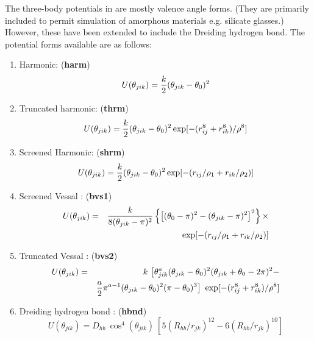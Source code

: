 The three-body potentials in \D are
mostly valence angle forms.  (They
are primarily included to permit simulation of amorphous materials
e.g. silicate glasses.)  However, these have been extended to
include the Dreiding \cite{mayo-90a}
hydrogen bond.  The potential forms available are as follows:
\begin{enumerate}
\item Harmonic:  ({\bf harm})
\begin{equation}
U(\theta_{jik}) = {k \over 2} (\theta_{jik} - \theta_{0})^{2}
\end{equation}
\item Truncated harmonic:  ({\bf thrm})
\begin{equation}
U(\theta_{jik}) = {k \over 2} (\theta_{jik} - \theta_{0})^{2}
\exp[-(r_{ij}^{8} + r_{ik}^{8}) / \rho^{8}]
\end{equation}
\item Screened Harmonic:  ({\bf shrm})
\begin{equation}
 U(\theta_{jik}) = {k \over 2} (\theta_{jik} - \theta_{0})^{2}
\exp[-(r_{ij} / \rho_{1} + r_{ik} / \rho_{2})]
\end{equation}
\item Screened Vessal \cite{vessal-94a}:  ({\bf bvs1})
\begin{eqnarray}
U(\theta_{jik}) &=& {k \over 8(\theta_{jik}-\pi)^{2}} \left\{ \left[
(\theta_{0} -\pi)^{2} -(\theta_{jik}-\pi)^{2} \right]^{2} \right\} \times \nonumber \\
& & \exp[-(r_{ij} / \rho_1 + r_{ik} / \rho_2)]
\end{eqnarray}
\item Truncated Vessal \cite{smith-95a}:  ({\bf bvs2})
\begin{eqnarray}
U(\theta_{jik})&=& k~\big[ \theta_{jik}^a (\theta_{jik}-\theta_0)^{2}
(\theta_{jik}+\theta_{0}-2\pi)^{2} - \nonumber \\
 & & {a \over 2} \pi^{a-1} (\theta_{jik}-\theta_{0})^{2}(\pi -
\theta_{0})^{3}\big]~\exp[-(r_{ij}^{8} + r_{ik}^{8}) / \rho^{8}]
\end{eqnarray}
\item Dreiding hydrogen bond \cite{mayo-90a}:  ({\bf hbnd})
\begin{equation}
U(\theta_{jik}) =
D_{hb}~\cos^{4}(\theta_{jik})~[5(R_{hb}/r_{jk})^{12}-6(R_{hb}/r_{jk})^{10}]
\end{equation}
\end{enumerate}
